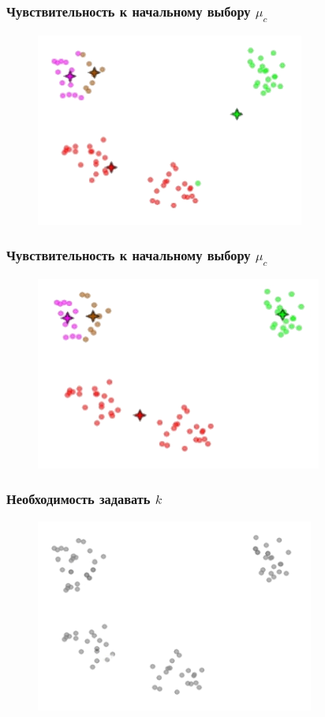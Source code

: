 \documentclass[12pt]{beamer}
\begin{document}
\begin{frame}\frametitle{Чувствительность к начальному выбору $\mu_c$}
\begin{figure}[htbp]
  \includegraphics[height=180pt, keepaspectratio = true]{images/local_min6}  
\end{figure}
\end{frame}

\begin{frame}\frametitle{Чувствительность к начальному выбору $\mu_c$}
\begin{figure}[htbp]
  \includegraphics[height=180pt, keepaspectratio = true]{images/local_min7}  
\end{figure}
\end{frame}

\begin{frame}\frametitle{Необходимость задавать $k$}
\begin{figure}[htbp]
  \includegraphics[height=180pt, keepaspectratio = true]{images/k_means_k}  
\end{figure}
\end{frame}
\end{document}
